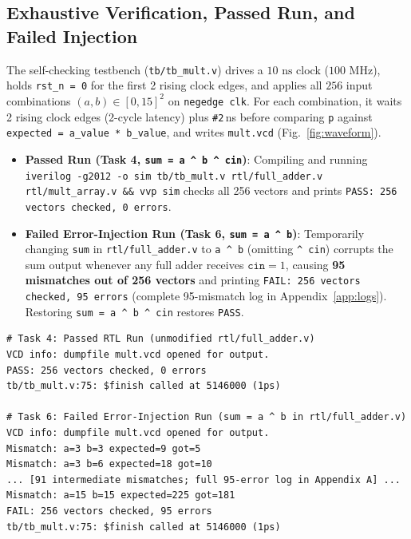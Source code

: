 \documentclass[conference,10pt]{IEEEtran}
\begin{document}
\subsection{Exhaustive Verification, Passed Run, and Failed Injection}
The self-checking testbench (\texttt{tb/tb\_mult.v}) drives a $10\text{ ns}$ clock ($100\text{ MHz}$), holds \texttt{rst\_n = 0} for the first 2 rising clock edges, and applies all $256$ input combinations $(a, b) \in [0, 15]^2$ on \texttt{negedge clk}. For each combination, it waits 2 rising clock edges (2-cycle latency) plus \texttt{\#2}\,ns before comparing \texttt{p} against \texttt{expected = a\_value * b\_value}, and writes \texttt{mult.vcd} (Fig.~\ref{fig:waveform}).
\begin{itemize}
    \item \textbf{Passed Run (Task 4, \texttt{sum = a \^{} b \^{} cin})}: Compiling and running \texttt{iverilog -g2012 -o sim tb/tb\_mult.v rtl/full\_adder.v rtl/mult\_array.v \&\& vvp sim} checks all 256 vectors and prints \texttt{PASS: 256 vectors checked, 0 errors}.
    \item \textbf{Failed Error-Injection Run (Task 6, \texttt{sum = a \^{} b})}: Temporarily changing \texttt{sum} in \texttt{rtl/full\_adder.v} to \texttt{a \^{} b} (omitting \texttt{\^{} cin}) corrupts the sum output whenever any full adder receives $\texttt{cin} = 1$, causing \textbf{95 mismatches out of 256 vectors} and printing \texttt{FAIL: 256 vectors checked, 95 errors} (complete 95-mismatch log in Appendix~\ref{app:logs}). Restoring \texttt{sum = a \^{} b \^{} cin} restores \texttt{PASS}.
\end{itemize}

\begin{lstlisting}[title={\textbf{Part A Passed Run and Failed Error-Injection Summary Lines}}]
# Task 4: Passed RTL Run (unmodified rtl/full_adder.v)
VCD info: dumpfile mult.vcd opened for output.
PASS: 256 vectors checked, 0 errors
tb/tb_mult.v:75: $finish called at 5146000 (1ps)

# Task 6: Failed Error-Injection Run (sum = a ^ b in rtl/full_adder.v)
VCD info: dumpfile mult.vcd opened for output.
Mismatch: a=3 b=3 expected=9 got=5
Mismatch: a=3 b=6 expected=18 got=10
... [91 intermediate mismatches; full 95-error log in Appendix A] ...
Mismatch: a=15 b=15 expected=225 got=181
FAIL: 256 vectors checked, 95 errors
tb/tb_mult.v:75: $finish called at 5146000 (1ps)
\end{lstlisting}

\end{document}
